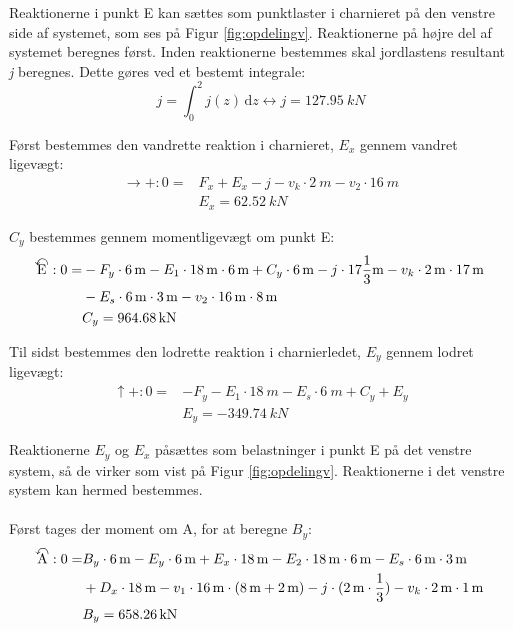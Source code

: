 Reaktionerne i punkt E kan sættes som punktlaster i charnieret på den venstre side af systemet, som ses på Figur \ref{fig:opdelingv}. Reaktionerne på højre del af systemet beregnes først.
\newline
\newline
Inden reaktionerne bestemmes skal jordlastens resultant \textit{j} beregnes. Dette gøres ved et bestemt integrale: 
\begin{equation}
	j = \int_{0}^{2} \! j(z) \, \mathrm{d}z \leftrightarrow j = \SI{127,95}{kN}
\end{equation}

Først bestemmes den vandrette reaktion i charnieret, $E_x$ gennem vandret ligevægt: 
\begin{equation}
\begin{split}
	\rightarrow+: 0 = & F_x + E_x - j - v_k \cdot \SI{2}{m} - v_2 \cdot \SI{16}{m}
	\\ &
	E_x = \SI{62,52}{kN}
\end{split}
\end{equation}

$C_y$ bestemmes gennem momentligevægt om punkt E: 
\begin{equation}
\begin{split}
	\ALN{\text{E}} :0 = & -F_y \cdot \SI{6}{m} - E_1 \cdot \SI{18}{m} \cdot \SI{6}{m} + C_y \cdot \SI{6}{m} - j \cdot 17 \frac{1}{3} \text{m} - v_k \cdot \SI{2}{m} \cdot \SI{17}{m} \\ & - E_s \cdot \SI{6}{m} \cdot \SI{3}{m} - v_2 \cdot \SI{16}{m} \cdot \SI{8}{m}
	\\ &
	C_y = \SI{964,68}{kN}
\end{split}
\end{equation}

Til sidst bestemmes den lodrette reaktion i charnierledet, $E_y$ gennem lodret ligevægt: 
\begin{equation}
\begin{split}
	\uparrow+: 0 = & - F_y - E_1 \cdot \SI{18}{m} - E_s \cdot \SI{6}{m} + C_y + E_y
	\\ &
	E_y = \SI{-349,74}{kN}
\end{split}
\end{equation}

Reaktionerne $E_y$ og $E_x$ påsættes som belastninger i punkt E på det venstre system, så de virker som vist på Figur \ref{fig:opdelingv}. Reaktionerne i det venstre system kan hermed bestemmes.
\\
\\
Først tages der moment om A, for at beregne $B_y$:
\begin{equation}
\begin{split}
	\ALN{\text{A}}: 0 = & B_y \cdot \SI{6}{m} - E_y \cdot \SI{6}{m} + E_x \cdot \SI{18}{m} - E_2 \cdot \SI{18}{m} \cdot \SI{6}{m} - E_s \cdot \SI{6}{m} \cdot \SI{3}{m} \\ & + D_x \cdot \SI{18}{m} - v_1 \cdot \SI{16}{m} \cdot (\SI{8}{m} + \SI{2}{m}) - j \cdot (\SI{2}{m} \cdot \frac{1}{3}) - v_k \cdot \SI{2}{m} \cdot \SI{1}{m}
	\\ &
	B_y = \SI{658,26}{kN}
\end{split}
\end{equation}

